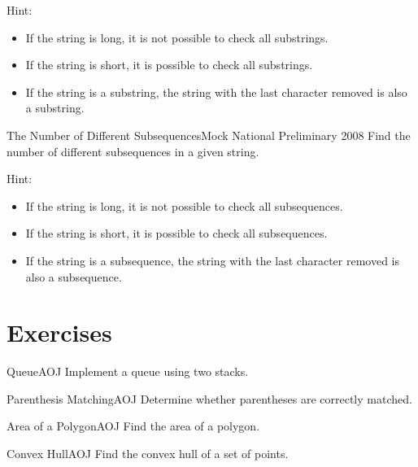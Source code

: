 Hint:
\begin{itemize}
\item If the string is long, it is not possible to check all substrings.
\item If the string is short, it is possible to check all substrings.
\item If the string is a substring, the string with the last character removed is also a substring.
\end{itemize}

\begin{pbox}{The Number of Different Subsequences}{Mock National Preliminary 2008}
Find the number of different subsequences in a given string.

\end{pbox}

Hint:
\begin{itemize}
\item If the string is long, it is not possible to check all subsequences.
\item If the string is short, it is possible to check all subsequences.
\item If the string is a subsequence, the string with the last character removed is also a subsequence.
\end{itemize}
\section{Exercises}

\begin{pbox}{Queue}{AOJ}
Implement a queue using two stacks.

\end{pbox}

\begin{pbox}{Parenthesis Matching}{AOJ}
Determine whether parentheses are correctly matched.

\end{pbox}

\begin{pbox}{Area of a Polygon}{AOJ}
Find the area of a polygon.

\end{pbox}

\begin{pbox}{Convex Hull}{AOJ}
Find the convex hull of a set of points.

\end{pbox}

